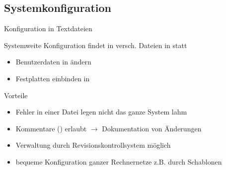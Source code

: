 \documentclass[aspectratio=43]{beamer}
\begin{document}
\subsection{Systemkonfiguration}

\begin{frame}{Konfiguration in Textdateien}
  \begin{block}{}
    Systemweite Konfiguration findet in versch. Dateien in  statt
    \begin{itemize}
      \small
      \item Benutzerdaten in  ändern
      \item Festplatten einbinden in 
    \end{itemize}
  \end{block}
  \begin{block}{Vorteile}
    \begin{itemize}
      \item Fehler in einer Datei legen nicht das ganze System lahm
      \item Kommentare (\co{\#}) erlaubt $\rightarrow$ Dokumentation von Änderungen
      \item Verwaltung durch Revisionskontrollsystem möglich
      \item bequeme Konfiguration ganzer Rechnernetze z.B. durch Schablonen
    \end{itemize}
  \end{block}
\end{frame}
\end{document}
